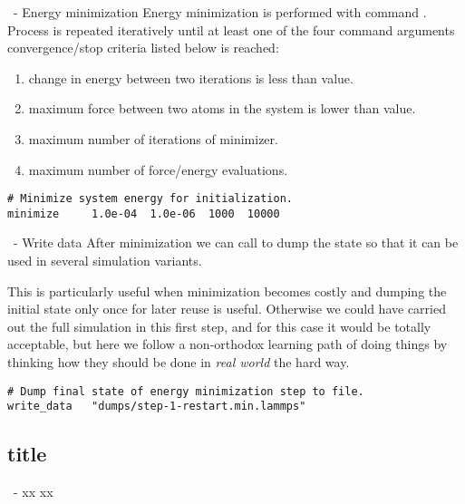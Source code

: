 \begin{frame}[fragile]{\secname}{\subsecname\ - Energy minimization}
Energy minimization is performed with command . Process is repeated iteratively until at least one of the four command arguments convergence/stop criteria listed below is reached:

\vspace{0.5cm}

\begin{enumerate}
\item change in energy between two iterations is less than value.
\item maximum force between two atoms in the system is lower than value.
\item maximum number of iterations of minimizer.
\item maximum number of force/energy evaluations.
\end{enumerate}
\vspace{0.5cm}

\begin{lstlisting}[language=LAMMPS]
# Minimize system energy for initialization.
minimize     1.0e-04  1.0e-06  1000  10000
\end{lstlisting}
\end{frame}

\begin{frame}[fragile]{\secname}{\subsecname\ - Write data}
After minimization we can call  to dump the state so that it can be used in several simulation variants.

\vspace{0.5cm}

This is particularly useful when minimization becomes costly and dumping the initial state only once for later reuse is useful. Otherwise we could have carried out the full simulation in this first step, and for this case it would be totally acceptable, but here we follow a non-orthodox learning path of doing things by thinking how they should be done in \emph{real world} the hard way.

\vspace{0.5cm}

\begin{lstlisting}[language=LAMMPS]
# Dump final state of energy minimization step to file.
write_data   "dumps/step-1-restart.min.lammps"
\end{lstlisting}
\end{frame}

\subsection{title}

\begin{frame}[fragile]{\secname}{\subsecname\ - xx}
xx

\vspace{0.5cm}

\vspace{0.5cm}

\begin{lstlisting}[language=LAMMPS]
\end{lstlisting}
\end{frame}

\endinput